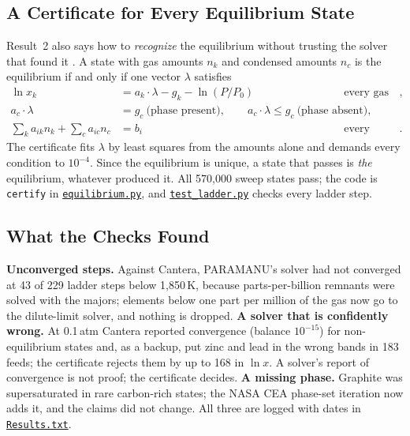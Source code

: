 \documentclass[11pt,a4paper]{article}
\newcommand{\gh}[2]{\href{https://github.com/syncaissa/paramanu-reclaimer/blob/main/#1}{\texttt{#2}}}
\theoremstyle{definition}
\theoremstyle{plain}
\theoremstyle{remark}
\begin{document}
\subsection{A Certificate for Every Equilibrium State}\label{sec:certificate}
Result~2 also says how to \emph{recognize} the equilibrium without trusting the solver that found it \citep{boyd2004}. A state with gas amounts $n_k$ and condensed amounts $n_c$ is the equilibrium if and only if one vector $\lambda$ satisfies
\begin{align}
\ln x_k &= a_k\cdot\lambda - g_k - \ln(P/P_0) && \text{every gas species}, \label{eq:cert1}\\
a_c\cdot\lambda &= g_c \ \text{(phase present)}, \qquad a_c\cdot\lambda \le g_c \ \text{(phase absent)}, && \label{eq:cert2}\\
\textstyle\sum_k a_{ik} n_k + \sum_c a_{ic} n_c &= b_i && \text{every element}. \label{eq:cert4}
\end{align}
The certificate fits $\lambda$ by least squares from the amounts alone and demands every condition to $10^{-4}$. Since the equilibrium is unique, a state that passes is \emph{the} equilibrium, whatever produced it. All 570,000 sweep states pass; the code is \texttt{certify} in \gh{simulation/paramanu_sim/equilibrium.py}{equilibrium.py}, and \gh{simulation/tests/test_ladder.py}{test\_ladder.py} checks every ladder step.

\subsection{What the Checks Found}\label{sec:defects}
\textbf{Unconverged steps.} Against Cantera, PARAMANU's solver had not converged at 43 of 229 ladder steps below 1,850\,K, because parts-per-billion remnants were solved with the majors; elements below one part per million of the gas now go to the dilute-limit solver, and nothing is dropped. \textbf{A solver that is confidently wrong.} At 0.1\,atm Cantera reported convergence (balance $10^{-15}$) for non-equilibrium states and, as a backup, put zinc and lead in the wrong bands in 183 feeds; the certificate rejects them by up to 168 in $\ln x$. A solver's report of convergence is not proof; the certificate decides. \textbf{A missing phase.} Graphite was supersaturated in rare carbon-rich states; the NASA CEA phase-set iteration now adds it, and the claims did not change. All three are logged with dates in \gh{Results.txt}{Results.txt}.
\end{document}
